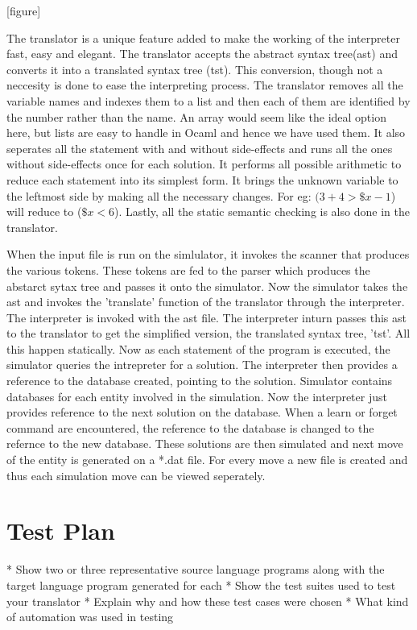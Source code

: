 \documentclass[onecolumn,titlepage]{article}
\begin{document}
[figure]

The translator is a unique feature added to make the working of the
interpreter fast, easy and elegant. The translator accepts the
abstract syntax tree(ast) and converts it into a translated syntax
tree (tst). This conversion, though not a neccesity is done to ease
the interpreting process. The translator removes all the variable
names and indexes them to a list and then each of them are identified
by the number rather than the name. An array would seem like the ideal
option here, but lists are easy to handle in Ocaml and hence we have
used them. It also seperates all the statement with and without
side-effects and runs all the ones without side-effects once for each
solution. It performs all possible arithmetic to reduce each
statement into its simplest form. It brings the unknown variable to
the leftmost side by making all the necessary changes. For eg:
$(3+4>\$x-1$) will reduce to ($\$x<6$). Lastly, all the static semantic
checking is also done in the translator.


When the input file is run on the simlulator, it invokes the scanner
that produces the various tokens. These tokens are fed to the parser
which produces the abstarct sytax tree and passes it onto the
simulator. Now the simulator takes the ast and invokes the 'translate'
function of the translator through the interpreter. The interpreter is
invoked with the ast file. The interpreter inturn passes this ast to
the translator to get the simplified version, the translated syntax
tree, 'tst'. All this happen statically. Now as each statement of the
program is executed, the simulator queries the intrepreter for a
solution. The interpreter then provides  a reference to the database
created, pointing to the solution. Simulator contains databases for
each entity involved in the simulation. Now the interpreter just
provides reference to the next solution on the database. When a learn
or forget command are encountered, the reference to the database is
changed to the refernce to the new database. These solutions are then
simulated and next move of the entity is generated on a *.dat
file. For every move a new file is created and thus each simulation
move can be viewed seperately.


\section{Test Plan}

    * Show two or three representative source language programs along with the target language program generated for each
    * Show the test suites used to test your translator
    * Explain why and how these test cases were chosen
    * What kind of automation was used in testing
\end{document}
